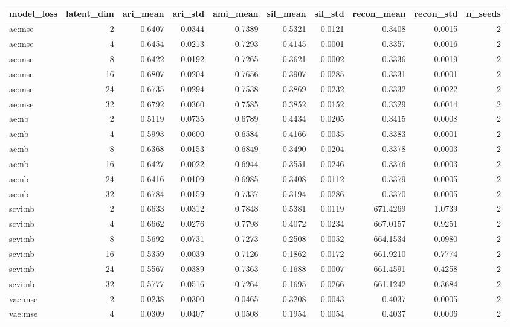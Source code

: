 \begin{tabular}{lrrrrrrrrr}
\toprule
model\_loss & latent\_dim & ari\_mean & ari\_std & ami\_mean & sil\_mean & sil\_std & recon\_mean & recon\_std & n\_seeds \\
\midrule
ae:mse & 2 & 0.6407 & 0.0344 & 0.7389 & 0.5321 & 0.0121 & 0.3408 & 0.0015 & 2 \\
ae:mse & 4 & 0.6454 & 0.0213 & 0.7293 & 0.4145 & 0.0001 & 0.3357 & 0.0016 & 2 \\
ae:mse & 8 & 0.6422 & 0.0192 & 0.7265 & 0.3621 & 0.0002 & 0.3336 & 0.0019 & 2 \\
ae:mse & 16 & 0.6807 & 0.0204 & 0.7656 & 0.3907 & 0.0285 & 0.3331 & 0.0001 & 2 \\
ae:mse & 24 & 0.6735 & 0.0294 & 0.7538 & 0.3869 & 0.0232 & 0.3332 & 0.0022 & 2 \\
ae:mse & 32 & 0.6792 & 0.0360 & 0.7585 & 0.3852 & 0.0152 & 0.3329 & 0.0014 & 2 \\
ae:nb & 2 & 0.5119 & 0.0735 & 0.6789 & 0.4434 & 0.0205 & 0.3415 & 0.0008 & 2 \\
ae:nb & 4 & 0.5993 & 0.0600 & 0.6584 & 0.4166 & 0.0035 & 0.3383 & 0.0001 & 2 \\
ae:nb & 8 & 0.6368 & 0.0153 & 0.6849 & 0.3490 & 0.0204 & 0.3378 & 0.0003 & 2 \\
ae:nb & 16 & 0.6427 & 0.0022 & 0.6944 & 0.3551 & 0.0246 & 0.3376 & 0.0003 & 2 \\
ae:nb & 24 & 0.6416 & 0.0109 & 0.6985 & 0.3408 & 0.0112 & 0.3379 & 0.0005 & 2 \\
ae:nb & 32 & 0.6784 & 0.0159 & 0.7337 & 0.3194 & 0.0286 & 0.3370 & 0.0005 & 2 \\
scvi:nb & 2 & 0.6633 & 0.0312 & 0.7848 & 0.5381 & 0.0119 & 671.4269 & 1.0739 & 2 \\
scvi:nb & 4 & 0.6662 & 0.0276 & 0.7798 & 0.4072 & 0.0234 & 667.0157 & 0.9251 & 2 \\
scvi:nb & 8 & 0.5692 & 0.0731 & 0.7273 & 0.2508 & 0.0052 & 664.1534 & 0.0980 & 2 \\
scvi:nb & 16 & 0.5359 & 0.0039 & 0.7126 & 0.1862 & 0.0172 & 661.9210 & 0.7774 & 2 \\
scvi:nb & 24 & 0.5567 & 0.0389 & 0.7363 & 0.1688 & 0.0007 & 661.4591 & 0.4258 & 2 \\
scvi:nb & 32 & 0.5777 & 0.0516 & 0.7264 & 0.1695 & 0.0266 & 661.1242 & 0.3684 & 2 \\
vae:mse & 2 & 0.0238 & 0.0300 & 0.0465 & 0.3208 & 0.0043 & 0.4037 & 0.0005 & 2 \\
vae:mse & 4 & 0.0309 & 0.0407 & 0.0508 & 0.1954 & 0.0054 & 0.4037 & 0.0006 & 2 \\

\end{tabular}
